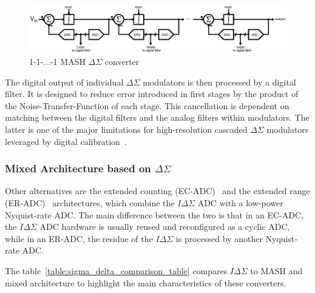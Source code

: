 \begin{figure}[htp]
    \centering
    \includegraphics[width=\textwidth]{Chapter2/Figs/Vector/sigma-delta-mash.ps}
    \caption{1-1-...-1 MASH $\Delta\Sigma$ converter}
    \label{fig:multi-bit}
\end{figure}

The digital output of individual \(\Delta\Sigma \) modulators is then processed by a digital filter. It is designed to reduce error introduced in first stages by the product of the Noise-Transfer-Function of each stage. This cancellation is dependent on matching between the digital filters and the analog filters within modulators. The latter is one of the major limitations for high-resolution cascaded \(\Delta\Sigma \) modulators leveraged by digital calibration~\cite{Cauwenberghs2000}.

\subsubsection{Mixed Architecture based on $\Delta\Sigma$}
Other alternatives are the extended counting (EC-ADC)~\cite{Jeon2017,Baird1995,Chen2016} and the extended range (ER-ADC)~\cite{Agah2010,Rossi2009} architectures, which combine the \(I\Delta\Sigma \) ADC with a low-power Nyquist-rate ADC\@. The main difference between the two is that in an EC-ADC, the \(I\Delta\Sigma \) ADC hardware is usually reused and reconfigured as a cyclic ADC, while in an ER-ADC, the residue of the \(I\Delta\Sigma \) is processed by another Nyquist-rate ADC\@.

The table~\ref{table:sigma_delta_comparison_table} compares \(I\Delta\Sigma \) to MASH and mixed architecture to highlight the main characteristics of these converters.

